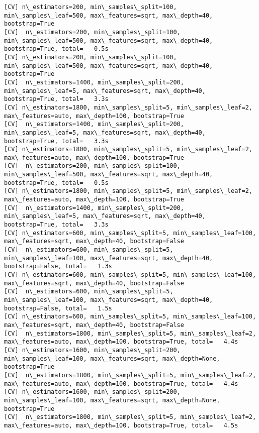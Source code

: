 \documentclass[11pt]{article}
\begin{document}
\begin{Verbatim}[commandchars=\\\{\}]
[CV] n\_estimators=200, min\_samples\_split=100, min\_samples\_leaf=500, max\_features=sqrt, max\_depth=40, bootstrap=True 
[CV]  n\_estimators=200, min\_samples\_split=100, min\_samples\_leaf=500, max\_features=sqrt, max\_depth=40, bootstrap=True, total=   0.5s
[CV] n\_estimators=200, min\_samples\_split=100, min\_samples\_leaf=500, max\_features=sqrt, max\_depth=40, bootstrap=True 
[CV]  n\_estimators=1400, min\_samples\_split=200, min\_samples\_leaf=5, max\_features=sqrt, max\_depth=40, bootstrap=True, total=   3.3s
[CV] n\_estimators=1800, min\_samples\_split=5, min\_samples\_leaf=2, max\_features=auto, max\_depth=100, bootstrap=True 
[CV]  n\_estimators=1400, min\_samples\_split=200, min\_samples\_leaf=5, max\_features=sqrt, max\_depth=40, bootstrap=True, total=   3.3s
[CV] n\_estimators=1800, min\_samples\_split=5, min\_samples\_leaf=2, max\_features=auto, max\_depth=100, bootstrap=True 
[CV]  n\_estimators=200, min\_samples\_split=100, min\_samples\_leaf=500, max\_features=sqrt, max\_depth=40, bootstrap=True, total=   0.5s
[CV] n\_estimators=1800, min\_samples\_split=5, min\_samples\_leaf=2, max\_features=auto, max\_depth=100, bootstrap=True 
[CV]  n\_estimators=1400, min\_samples\_split=200, min\_samples\_leaf=5, max\_features=sqrt, max\_depth=40, bootstrap=True, total=   3.3s
[CV] n\_estimators=600, min\_samples\_split=5, min\_samples\_leaf=100, max\_features=sqrt, max\_depth=40, bootstrap=False 
[CV]  n\_estimators=600, min\_samples\_split=5, min\_samples\_leaf=100, max\_features=sqrt, max\_depth=40, bootstrap=False, total=   1.3s
[CV] n\_estimators=600, min\_samples\_split=5, min\_samples\_leaf=100, max\_features=sqrt, max\_depth=40, bootstrap=False 
[CV]  n\_estimators=600, min\_samples\_split=5, min\_samples\_leaf=100, max\_features=sqrt, max\_depth=40, bootstrap=False, total=   1.5s
[CV] n\_estimators=600, min\_samples\_split=5, min\_samples\_leaf=100, max\_features=sqrt, max\_depth=40, bootstrap=False 
[CV]  n\_estimators=1800, min\_samples\_split=5, min\_samples\_leaf=2, max\_features=auto, max\_depth=100, bootstrap=True, total=   4.4s
[CV] n\_estimators=1600, min\_samples\_split=200, min\_samples\_leaf=100, max\_features=sqrt, max\_depth=None, bootstrap=True 
[CV]  n\_estimators=1800, min\_samples\_split=5, min\_samples\_leaf=2, max\_features=auto, max\_depth=100, bootstrap=True, total=   4.4s
[CV] n\_estimators=1600, min\_samples\_split=200, min\_samples\_leaf=100, max\_features=sqrt, max\_depth=None, bootstrap=True 
[CV]  n\_estimators=1800, min\_samples\_split=5, min\_samples\_leaf=2, max\_features=auto, max\_depth=100, bootstrap=True, total=   4.5s

\end{Verbatim}
\end{document}
